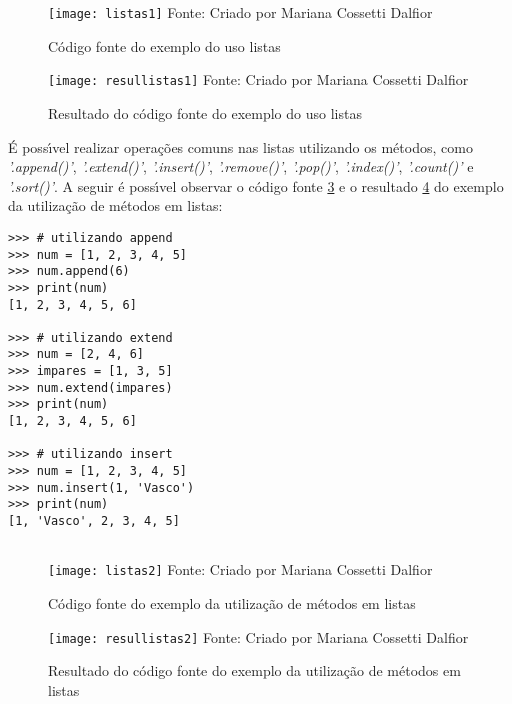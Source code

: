 \begin{figure}[H]
	\begin{center}
		\caption{C\'{o}digo fonte do exemplo do uso listas} \label{fontelistas1}
		\texttt{[image: listas1]} 
		\newline
		Fonte: Criado por Mariana Cossetti Dalfior
	\end{center}
\end{figure}

\begin{figure}[H]
	\begin{center}
		\caption{Resultado do c\'{o}digo fonte do exemplo do uso listas} \label{resullistas1}
		\texttt{[image: resullistas1]} 
		\newline
		Fonte: Criado por Mariana Cossetti Dalfior
	\end{center}
\end{figure}

\'{E} poss\'{\i}vel realizar opera\c{c}\~{o}es comuns nas listas utilizando os m\'{e}todos, como \textsl{'.append()'}, \textsl{'.extend()'}, \textsl{'.insert()'}, \textsl{'.remove()'}, \textsl{'.pop()'}, \textsl{'.index()'}, \textsl{'.count()'} e \textsl{'.sort()'}. A seguir \'{e} poss\'{\i}vel observar o c\'{o}digo fonte \ref{fontelistas2} e o resultado \ref{resullistas2} do exemplo da utiliza\c{c}\~{a}o de m\'{e}todos em listas:

\begin{lstlisting}
>>> # utilizando append
>>> num = [1, 2, 3, 4, 5]
>>> num.append(6)
>>> print(num)
[1, 2, 3, 4, 5, 6]

>>> # utilizando extend 
>>> num = [2, 4, 6]
>>> impares = [1, 3, 5]
>>> num.extend(impares)
>>> print(num)
[1, 2, 3, 4, 5, 6]

>>> # utilizando insert
>>> num = [1, 2, 3, 4, 5]
>>> num.insert(1, 'Vasco')
>>> print(num)
[1, 'Vasco', 2, 3, 4, 5]
	
\end{lstlisting}

\begin{figure}[H]
	\begin{center}
		\caption{C\'{o}digo fonte do exemplo da utiliza\c{c}\~{a}o de m\'{e}todos em listas} \label{fontelistas2}
		\texttt{[image: listas2]} 
		\newline
		Fonte: Criado por Mariana Cossetti Dalfior
	\end{center}
\end{figure}

\begin{figure}[H]
	\begin{center}
		\caption{Resultado do c\'{o}digo fonte do exemplo da utiliza\c{c}\~{a}o de m\'{e}todos em listas} \label{resullistas2}
		\texttt{[image: resullistas2]} 
		\newline
		Fonte: Criado por Mariana Cossetti Dalfior
	\end{center}
\end{figure}

